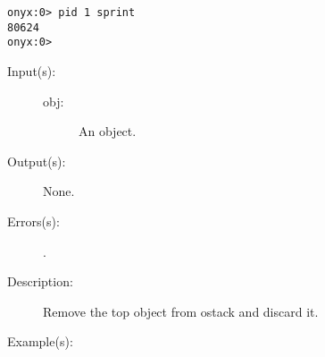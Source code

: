 \begin{description}
\begin{description}
\begin{verbatim}
onyx:0> pid 1 sprint
80624
onyx:0>
		\end{verbatim}
	\end{description}
\label{systemdict:pop}
\item[{\onyxop{obj}{pop}{--}}: ]
	\begin{description}\item[]
	\item[Input(s): ]
		\begin{description}\item[]
		\item[obj: ]
			An object.
		\end{description}
	\item[Output(s): ] None.
	\item[Errors(s): ]
		\begin{description}\item[]
		\item[.]
		\end{description}
	\item[Description: ]
		Remove the top object from ostack and discard it.
	\item[Example(s): ]\begin{verbatim}


\end{verbatim}
\end{description}
\end{description}
